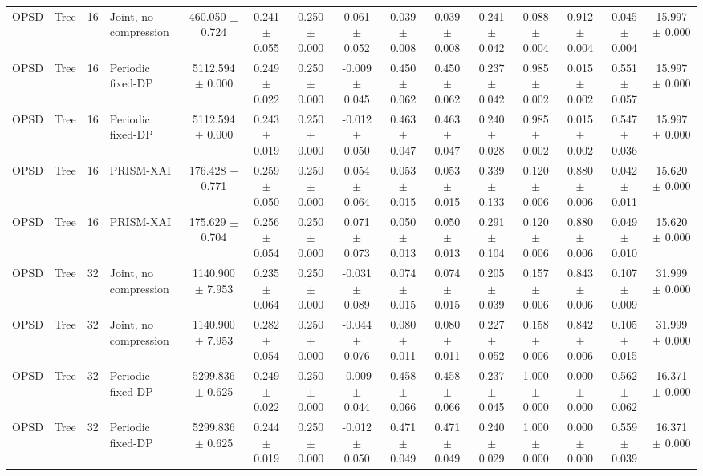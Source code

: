 \begin{table}[t]
\begin{tabular}{llllccccccccccc}
OPSD & Tree & 16 & Joint, no compression & 460.050 $\pm$ 0.724 & 0.241 $\pm$ 0.055 & 0.250 $\pm$ 0.000 & 0.061 $\pm$ 0.052 & 0.039 $\pm$ 0.008 & 0.039 $\pm$ 0.008 & 0.241 $\pm$ 0.042 & 0.088 $\pm$ 0.004 & 0.912 $\pm$ 0.004 & 0.045 $\pm$ 0.004 & 15.997 $\pm$ 0.000 \\
OPSD & Tree & 16 & Periodic fixed-DP & 5112.594 $\pm$ 0.000 & 0.249 $\pm$ 0.022 & 0.250 $\pm$ 0.000 & -0.009 $\pm$ 0.045 & 0.450 $\pm$ 0.062 & 0.450 $\pm$ 0.062 & 0.237 $\pm$ 0.042 & 0.985 $\pm$ 0.002 & 0.015 $\pm$ 0.002 & 0.551 $\pm$ 0.057 & 15.997 $\pm$ 0.000 \\
OPSD & Tree & 16 & Periodic fixed-DP & 5112.594 $\pm$ 0.000 & 0.243 $\pm$ 0.019 & 0.250 $\pm$ 0.000 & -0.012 $\pm$ 0.050 & 0.463 $\pm$ 0.047 & 0.463 $\pm$ 0.047 & 0.240 $\pm$ 0.028 & 0.985 $\pm$ 0.002 & 0.015 $\pm$ 0.002 & 0.547 $\pm$ 0.036 & 15.997 $\pm$ 0.000 \\
OPSD & Tree & 16 & PRISM-XAI & 176.428 $\pm$ 0.771 & 0.259 $\pm$ 0.050 & 0.250 $\pm$ 0.000 & 0.054 $\pm$ 0.064 & 0.053 $\pm$ 0.015 & 0.053 $\pm$ 0.015 & 0.339 $\pm$ 0.133 & 0.120 $\pm$ 0.006 & 0.880 $\pm$ 0.006 & 0.042 $\pm$ 0.011 & 15.620 $\pm$ 0.000 \\
OPSD & Tree & 16 & PRISM-XAI & 175.629 $\pm$ 0.704 & 0.256 $\pm$ 0.054 & 0.250 $\pm$ 0.000 & 0.071 $\pm$ 0.073 & 0.050 $\pm$ 0.013 & 0.050 $\pm$ 0.013 & 0.291 $\pm$ 0.104 & 0.120 $\pm$ 0.006 & 0.880 $\pm$ 0.006 & 0.049 $\pm$ 0.010 & 15.620 $\pm$ 0.000 \\
OPSD & Tree & 32 & Joint, no compression & 1140.900 $\pm$ 7.953 & 0.235 $\pm$ 0.064 & 0.250 $\pm$ 0.000 & -0.031 $\pm$ 0.089 & 0.074 $\pm$ 0.015 & 0.074 $\pm$ 0.015 & 0.205 $\pm$ 0.039 & 0.157 $\pm$ 0.006 & 0.843 $\pm$ 0.006 & 0.107 $\pm$ 0.009 & 31.999 $\pm$ 0.000 \\
OPSD & Tree & 32 & Joint, no compression & 1140.900 $\pm$ 7.953 & 0.282 $\pm$ 0.054 & 0.250 $\pm$ 0.000 & -0.044 $\pm$ 0.076 & 0.080 $\pm$ 0.011 & 0.080 $\pm$ 0.011 & 0.227 $\pm$ 0.052 & 0.158 $\pm$ 0.006 & 0.842 $\pm$ 0.006 & 0.105 $\pm$ 0.015 & 31.999 $\pm$ 0.000 \\
OPSD & Tree & 32 & Periodic fixed-DP & 5299.836 $\pm$ 0.625 & 0.249 $\pm$ 0.022 & 0.250 $\pm$ 0.000 & -0.009 $\pm$ 0.044 & 0.458 $\pm$ 0.066 & 0.458 $\pm$ 0.066 & 0.237 $\pm$ 0.045 & 1.000 $\pm$ 0.000 & 0.000 $\pm$ 0.000 & 0.562 $\pm$ 0.062 & 16.371 $\pm$ 0.000 \\
OPSD & Tree & 32 & Periodic fixed-DP & 5299.836 $\pm$ 0.625 & 0.244 $\pm$ 0.019 & 0.250 $\pm$ 0.000 & -0.012 $\pm$ 0.050 & 0.471 $\pm$ 0.049 & 0.471 $\pm$ 0.049 & 0.240 $\pm$ 0.029 & 1.000 $\pm$ 0.000 & 0.000 $\pm$ 0.000 & 0.559 $\pm$ 0.039 & 16.371 $\pm$ 0.000 \\

\end{tabular}
\end{table}
